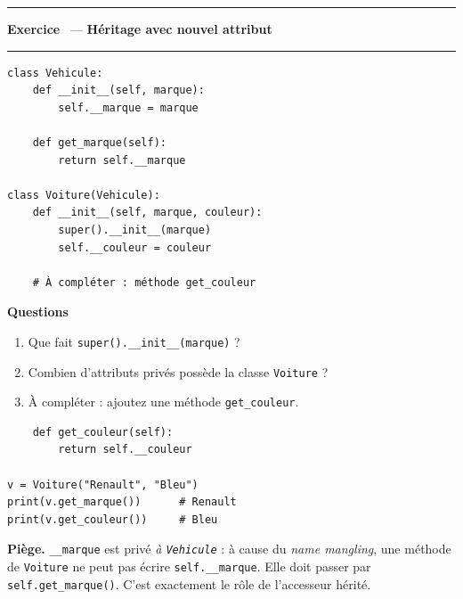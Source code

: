 \documentclass[10pt,a4paper]{article}
\newif\ifcorrige
\newcommand{\py}[1]{\texttt{#1}}
\newcounter{exo}
\newcommand{\exo}[1]{%
  \stepcounter{exo}\par\vspace{4pt}
  \ifcorrige\else\noindent\minipage{\textwidth}\fi
  \noindent\textcolor{qbar}{\rule{2.5pt}{10pt}}\hspace{4pt}%
  \textbf{\color{qbar}Exercice \theexo}\ --- \textbf{#1}%
  \par\nobreak\vspace{-3pt}\noindent\textcolor{qbar!35}{\rule{\textwidth}{0.6pt}}%
  \par\nobreak\vspace{1pt}}
\newenvironment{codebloc}
  {\ifcorrige\else\noindent\minipage[t]{0.50\textwidth}\vspace{0pt}\fi}
  {\ifcorrige\else\endminipage\hfill\fi}
\newenvironment{qbloc}
  {\ifcorrige\else\minipage[t]{0.475\textwidth}\vspace{0pt}\fi
   \textbf{\small Questions}\begin{enumerate}[leftmargin=*,nosep,label=\arabic*.]}
  {\end{enumerate}\ifcorrige\else\endminipage\par\fi}
\newcommand{\rep}[1]{\ifcorrige\par\smallskip{\color{corr}\small#1}\par\smallskip\fi}
\newlength{\zoneadj}\setlength{\zoneadj}{0pt}
\newcommand{\zone}[1][4cm]{%
  \ifcorrige\else
    \par\vspace{2pt}\noindent
    \begin{tcolorbox}[colback=white,colframe=black!45,boxrule=0.5pt,arc=1pt,height={\dimexpr#1-\zoneadj\relax},
      left=4pt,right=4pt,top=2pt,bottom=2pt,
      title={\scriptsize\itshape Réponses},coltitle=black!55,fonttitle=\itshape,
      detach title,before upper={\tcbtitle\par}]\end{tcolorbox}%
    \endminipage\par
  \fi}
\newenvironment{solution}
  {\ifcorrige
     \begin{tcolorbox}[enhanced,breakable,colback=corrbg,colframe=corr,boxrule=0.6pt,arc=1pt,
       left=5pt,right=5pt,top=3pt,bottom=3pt,fontupper=\small,
       title={Corrigé},coltitle=corr,fonttitle=\bfseries\small,detach title,
       before upper={\tcbtitle\par\smallskip}]%
   \else
     \setbox0\vbox\bgroup
   \fi}
  {\ifcorrige\end{tcolorbox}\else\egroup\fi}
\begin{document}
\exo{Héritage avec nouvel attribut}
\begin{codebloc}
\begin{lstlisting}
class Vehicule:
    def __init__(self, marque):
        self.__marque = marque

    def get_marque(self):
        return self.__marque

class Voiture(Vehicule):
    def __init__(self, marque, couleur):
        super().__init__(marque)
        self.__couleur = couleur

    # À compléter : méthode get_couleur
\end{lstlisting}
\end{codebloc}
\begin{qbloc}
  \item Que fait \py{super().__init__(marque)} ?
    \rep{Il appelle le constructeur de la classe mère \py{Vehicule} pour initialiser la partie
    héritée de l'objet, ici l'attribut privé \py{__marque}. Sans cet appel, \py{get_marque}
    échouerait car l'attribut n'aurait jamais été créé.}
  \item Combien d'attributs privés possède la classe \py{Voiture} ?
    \rep{Deux au total dans l'objet : \py{_Vehicule__marque}, hérité et initialisé par \py{super()},
    et \py{_Voiture__couleur}, propre à \py{Voiture}. La classe \py{Voiture} n'en déclare qu'un seul
    elle-même.}
  \item À compléter : ajoutez une méthode \py{get_couleur}.
\end{qbloc}
\zone[4.0cm]
\begin{solution}
\begin{lstlisting}
    def get_couleur(self):
        return self.__couleur

v = Voiture("Renault", "Bleu")
print(v.get_marque())      # Renault
print(v.get_couleur())     # Bleu
\end{lstlisting}
\textcolor{ipred}{\textbf{Piège.}} \py{__marque} est privé \emph{à \py{Vehicule}} : à cause du
\emph{name mangling}, une méthode de \py{Voiture} ne peut pas écrire \py{self.__marque}. Elle doit
passer par \py{self.get_marque()}. C'est exactement le rôle de l'accesseur hérité.
\end{solution}
\end{document}
